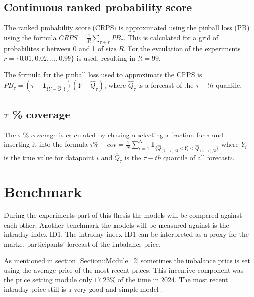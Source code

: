 \documentclass[class=scrbook, crop=false]{standalone}
\begin{document}
\subsection{Continuous ranked probability score}

The ranked probability score (CRPS) is approximated using the pinball loss (PB) using the formula $CRPS = \frac{1}{R} \sum_{\tau\in r} PB_{\tau}$. 
This is calculated for a grid of probabilites $r$ between 0 and 1 of size $R$.
For the evaulation of the experiments $r=\{0.01, 0.02, ..., 0.99\}$ is used, resulting in $R=99$.

The formula for the pinball loss used to approximate the CRPS is $PB_{\tau} = (\tau - \mathbf{1}_{\{Y - \hat{Q}_{\tau}\}}) (Y-\hat{Q}_{\tau}) $,
where $\hat{Q}_{\tau}$ is a forecast of the $\tau -th$ quantile.

\subsection{$\tau$ \% coverage}

The $\tau$ \% coverage is calculated by chosing a selecting a fraction for $\tau$ and inserting it into the formula $\tau\%-cov = \frac{1}{N} \sum_{i=1}^{N} \mathbf{1}_{\{\hat{Q}_{(1-\tau)/2} < Y_i < \hat{Q}_{(1+\tau)/2} \}}$
where $Y_i$ is the true value for datapoint $i$ and  $\hat{Q}_{\tau}$ is the $\tau -th$ quantile of all forecasts.

\section{Benchmark}
\label{Section:Benchmark}

During the experiments part of this thesis the models will be compared against each other.
Another benchmark the models will be measured against is the intraday index ID1.
The intraday index ID1 can be interpreted as a proxy for the market participants' forecast of the imbalance price.


As mentioned in section \ref{Section::Module_2} sometimes the imbalance price is set using the average price of the most recent prices.
This incentive component was the price setting module only $17.23\%$ of the time in 2024.
The most recent intraday price still is a very good and simple model \cite{narajewskiProbabilisticForecastingGerman2022}.
\end{document}
